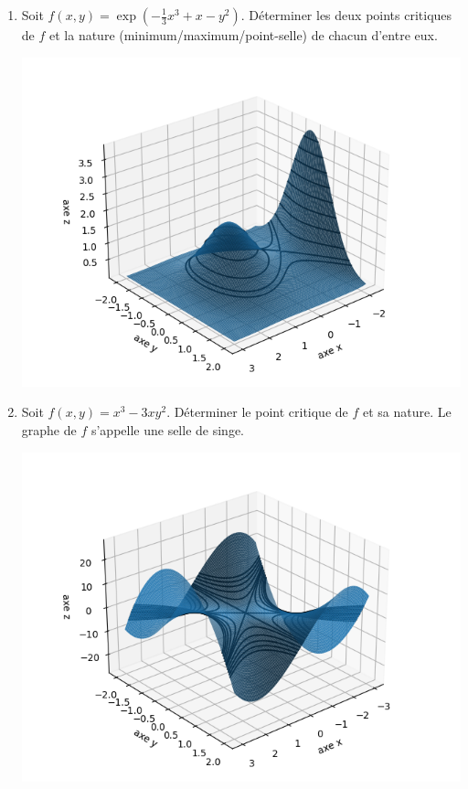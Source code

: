 \documentclass[11pt, class=report,crop=false]{standalone}
\begin{document}
\begin{miniexercices}
    \sauteligne
    \begin{enumerate}
        \item Soit $f(x,y)=\exp(-\frac 13 x^3 + x - y^2)$. Déterminer les deux points critiques de $f$ et la nature (minimum/maximum/point-selle) de chacun d'entre eux.

\begin{center}
\includegraphics[scale=\myscale,scale=0.6]{figures/fonctions-extrem-7}
\end{center}



        \item Soit $f(x,y)=x^3-3xy^2$. Déterminer le point critique de $f$ et sa nature.
        Le graphe de $f$ s'appelle une \og{}selle de singe\fg{}.

\begin{center}
\includegraphics[scale=\myscale,scale=0.6]{figures/fonctions-extrem-6}
\end{center}


\end{enumerate}
\end{miniexercices}
\end{document}
